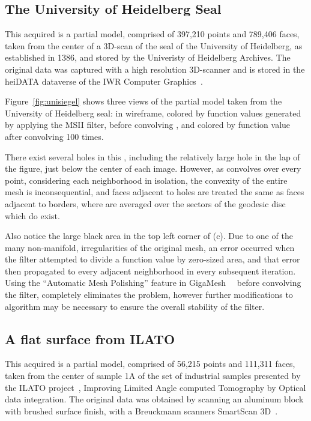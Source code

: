 %
%
%
%
\subsection{The University of Heidelberg Seal}
\label{ch6sATDDssUHS}
This acquired \tdd{} is a partial model, comprised of 397,210 points and 789,406 faces, taken from the center of a 3D-scan of the seal of the University of Heidelberg, as established in 1386, and stored by the Univeristy of Heidelberg Archives. The original data was captured with a high resolution 3D-scanner and is stored in the heiDATA dataverse of the IWR Computer Graphics~\cite{Unisiegel}.

Figure~\ref{fig:unisiegel} shows three views of the partial model taken from the University of Heidelberg seal: in wireframe, colored by function values generated by applying the MSII filter, before convolving , and colored by function value after convolving  100 times.



There exist several holes in this \tdd{}, including the relatively large hole in the lap of the figure, just below the center of each image. However, as  convolves over every point, considering each neighborhood in isolation, the convexity of the entire mesh is inconsequential, and faces adjacent to holes are treated the same as faces adjacent to borders, where  are averaged over the sectors of the geodesic disc which do exist.

Also notice the large black area in the top left corner of (c). Due to one of the many non-manifold, irregularities of the original mesh, an error occurred when the filter attempted to divide a function value by zero-sized area, and that error then propagated to every adjacent neighborhood in every subsequent iteration. Using the ``Automatic Mesh Polishing'' feature in GigaMesh~\cite[p.~29-32]{Mara12}~\cite[p.7]{Giga17} before convolving the filter, completely eliminates the problem, however further modifications to  algorithm may be necessary to ensure the overall stability of the filter.

%
%
%
%
\subsection{A flat surface from \gls{ILATO}}
\label{ch6sATDDssI}
This acquired \tdd{} is a partial model, comprised of 56,215 points and 111,311 faces, taken from the center of sample 1A of the set of industrial samples presented by the \gls{ILATO} project~, Improving Limited Angle computed Tomography by Optical data integration\cite{ILATO14}. The original data was obtained by scanning an aluminum block with brushed surface finish, with a Breuckmann scanners SmartScan 3D~\cite{Bayer16}.

